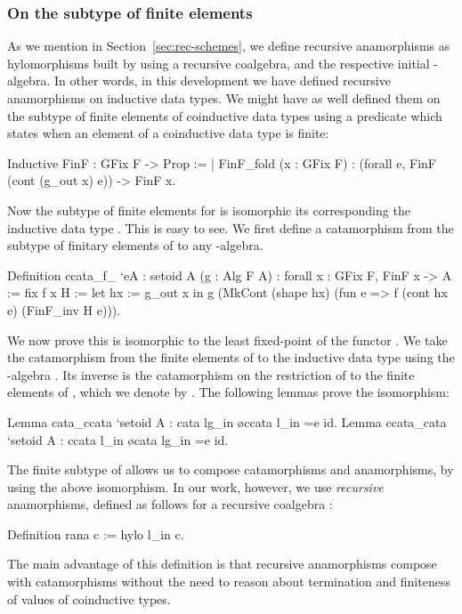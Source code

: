 \documentclass{llncs}
\begin{document}
\subsubsection{On the subtype of finite elements}
As we mention in
Section~\ref{sec:rec-schemes}, we define recursive anamorphisms as
hylomorphisms built by using a recursive coalgebra, and the respective
initial -algebra.
In other words, in this development we have defined recursive anamorphisms on inductive data
types.  We might have as well defined them on the subtype of finite elements of
coinductive data types using a predicate which states when an element of a
coinductive data type is finite:
\begin{coqcode}
Inductive FinF : GFix F -> Prop :=
| FinF_fold (x : GFix F) : (forall e, FinF (cont (g_out x) e)) -> FinF x.
\end{coqcode}
Now the subtype  of finite elements for 
is isomorphic its corresponding the inductive data type . This is
easy to see. We first define a catamorphism  from the
subtype  of finitary elements of  to
any -algebra.
\begin{coqcode}
Definition ccata_f_ `{eA : setoid A} (g : Alg F A)
  : forall x : GFix F, FinF x -> A := fix f x H :=
    let hx := g_out x in
      g (MkCont (shape hx) (fun e => f (cont hx e) (FinF_inv H e))).
\end{coqcode}
We now prove this is isomorphic to the least fixed-point of the functor
.
We take the catamorphism from the finite elements of  to the
inductive data type  using the -algebra . Its
inverse is the catamorphism on the restriction of  to the finite
elements of , which we denote by .  The following lemmas
prove the isomorphism:
\begin{coqcode}
Lemma cata_ccata `{setoid A} : cata lg_in \o ccata l_in =e id.
Lemma ccata_cata `{setoid A} : ccata l_in \o cata lg_in =e id.
\end{coqcode}
The finite subtype of  allows us to compose
catamorphisms and anamorphisms, by using the above isomorphism. In our work,
however, we use \emph{recursive} anamorphisms, defined as follows for
a recursive coalgebra :
\begin{coqcode}
Definition rana c := hylo l_in c.
\end{coqcode}

\noindent
The main advantage of this definition is that recursive anamorphisms
compose with catamorphisms without the need to reason about termination
and finiteness of values of coinductive types.
\end{document}
